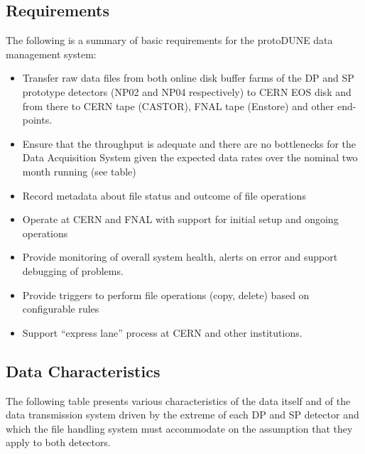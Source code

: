 
\subsection{Requirements}
The following is a summary of basic requirements for the protoDUNE data management system:
\begin{itemize}

\item Transfer raw data files from both online disk buffer farms of the DP and SP prototype detectors (NP02 and NP04 respectively) to CERN EOS disk and from there to CERN tape (CASTOR), FNAL tape (Enstore) and other end-points.

\item Ensure that the throughput is adequate and there are no bottlenecks for the Data Acquisition System given the expected data rates over the nominal two month running (see table)

\item Record metadata about file status and outcome of file operations

\item Operate at CERN and FNAL with support for initial setup and ongoing operations
\item Provide monitoring of overall system health, alerts on error and support debugging of problems.

\item Provide triggers to perform file operations (copy, delete) based on configurable rules

\item Support “express lane” process at CERN and other institutions.

\end{itemize}

\subsection{Data Characteristics}
The following table presents various characteristics of the data itself and of the data transmission system driven by the extreme
of each DP and SP detector and which the file handling system must accommodate on the assumption that they apply to both detectors.

